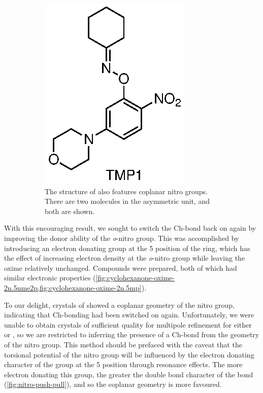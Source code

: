 \begin{refsection}
\begin{figure}
\begin{subfigure}[b]{0.47\linewidth}
        \includegraphics[scale=0.74]{Figures/cyclohexanone-oxime-2n-5mp.eps}
        \caption[Structure of .]{The structure of  also features coplanar nitro groups. There are two molecules in the asymmetric unit, and both are shown.}\label{fig:cyclohexanone-oxime-2n.5mp}
    \end{subfigure}
    \caption[Structures of .]{}
\end{figure}

With this encouraging result, we sought to switch the Ch-bond back on again by improving the donor ability of the \emph{o}-nitro group.
This was accomplished by introducing an electron donating group at the 5 position of the ring, which has the effect of increasing electron density at the \emph{o}-nitro group while leaving the oxime relatively unchanged.
Compounds  were prepared, both of which had similar electronic properties (\cref{fig:cyclohexanone-oxime-2n.5nme2p,fig:cyclohexanone-oxime-2n.5mp}).

To our delight, crystals of  showed a coplanar geometry of the nitro group, indicating that Ch-bonding had been switched on again.
Unfortunately, we were unable to obtain crystals of sufficient quality for multipole refinement for either  or , so we are restricted to inferring the presence of a Ch-bond from the geometry of the nitro group.
This method should be prefaced with the caveat that the torsional potential of the nitro group will be influenced by the electron donating character of the group at the 5 position through resonance effects.
The more electron donating this group, the greater the double bond character of the  bond (\cref{fig:nitro-push-pull}), and so the coplanar geometry is more favoured.


\end{refsection}
